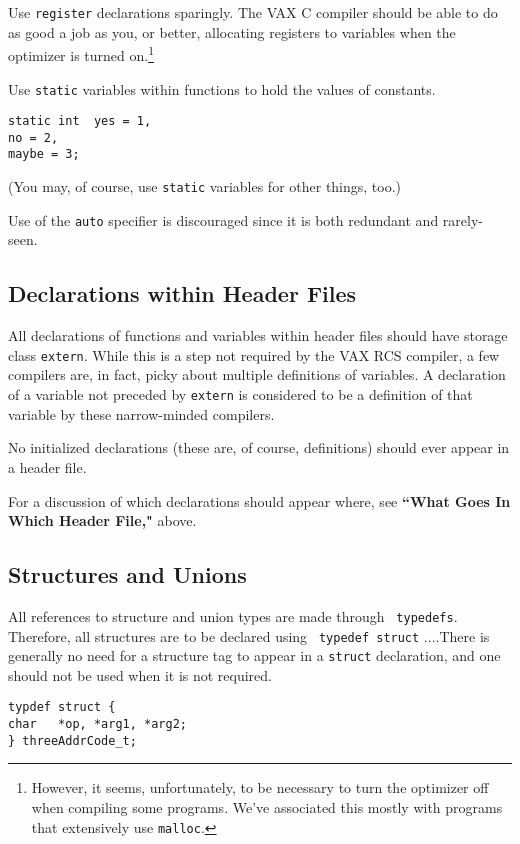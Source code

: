 Use {\tt register} declarations sparingly.  The VAX C compiler should
be able to do as good a job as you, or better, allocating registers to
variables when the optimizer is turned on.\footnote {However, it
seems, unfortunately, to be necessary to turn the optimizer off when
compiling some programs.  We've associated this mostly with programs
that extensively use {\tt malloc}.}

Use {\tt static} variables within functions to hold the values of constants.

\begin{verbatim}
static int  yes = 1,
no = 2,
maybe = 3;
\end{verbatim}

(You may, of course, use {\tt static} variables for other things, too.)

Use of the {\tt auto} specifier is discouraged since it is both
redundant and rarely-seen.

\subsection{Declarations within Header Files}

All declarations of functions and variables within header files should
have storage class {\tt extern}.  While this is a step not required by
the VAX RCS compiler, a few compilers are, in fact, picky about
multiple definitions of variables.  A declaration of a variable not
preceded by {\tt extern} is considered to be a definition of that
variable by these narrow-minded compilers.

No initialized declarations (these are, of course, definitions) should
ever appear in a header file.

For a discussion of which declarations should appear where, see {\bf
``What Goes In Which Header File,"} above.

\subsection{Structures and Unions}

All references to structure and union types are made through {\tt
typedefs}.  Therefore, all structures are to be declared using {\tt
typedef struct} ....There is generally no need for a structure tag to
appear in a {\tt struct} declaration, and one should not be used when
it is not required.

\begin{verbatim}
typdef struct {
char   *op, *arg1, *arg2;
} threeAddrCode_t;
\end{verbatim}

